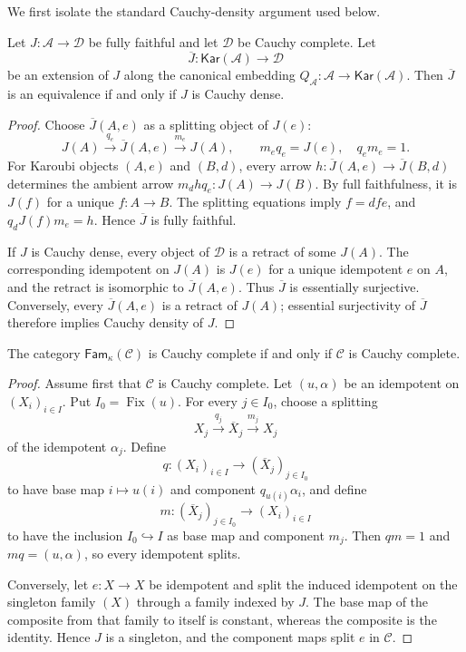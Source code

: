 \documentclass[runningheads,envcountsame]{llncs}
\newcommand{\Fam}{\mathsf{Fam}}
\newcommand{\Kar}{\mathsf{Kar}}
\newcommand{\Fix}{\operatorname{Fix}}
\begin{document}
We first isolate the standard Cauchy-density argument used below.

\begin{lemma}
\label{lem:cauchy-dense-extension-app}
Let $J:\mathcal A\to\mathcal D$ be fully faithful and let $\mathcal D$ be
Cauchy complete.  Let
$$
\overline J:\Kar(\mathcal A)\longrightarrow\mathcal D
$$
be an extension of $J$ along the canonical embedding
$Q_{\mathcal A}:\mathcal A\to\Kar(\mathcal A)$.  Then $\overline J$ is an
equivalence if and only if $J$ is Cauchy dense.
\end{lemma}

\begin{proof}
Choose $\overline J(A,e)$ as a splitting object of $J(e)$:
$$
J(A)\xrightarrow{q_e}\overline J(A,e)
\xrightarrow{m_e}J(A),
\qquad
m_eq_e=J(e),
\quad
q_em_e=1.
$$
For Karoubi objects $(A,e)$ and $(B,d)$, every arrow
$h:\overline J(A,e)\to\overline J(B,d)$ determines the ambient arrow
$m_dhq_e:J(A)\to J(B)$.  By full faithfulness, it is $J(f)$ for a unique
$f:A\to B$.  The splitting equations imply $f=dfe$, and
$q_dJ(f)m_e=h$.  Hence $\overline J$ is fully faithful.

If $J$ is Cauchy dense, every object of $\mathcal D$ is a retract of some
$J(A)$.  The corresponding idempotent on $J(A)$ is $J(e)$ for a unique
idempotent $e$ on $A$, and the retract is isomorphic to
$\overline J(A,e)$.  Thus $\overline J$ is essentially surjective.
Conversely, every $\overline J(A,e)$ is a retract of $J(A)$; essential
surjectivity of $\overline J$ therefore implies Cauchy density of $J$.
\end{proof}

\begin{lemma}
\label{lem:fam-cauchy-app}
The category $\Fam_\kappa(\mathcal C)$ is Cauchy complete if and only if
$\mathcal C$ is Cauchy complete.
\end{lemma}

\begin{proof}
Assume first that $\mathcal C$ is Cauchy complete.  Let $(u,\alpha)$ be an
idempotent on $(X_i)_{i\in I}$.  Put $I_0=\Fix(u)$.  For every $j\in I_0$,
choose a splitting
$$
X_j\xrightarrow{q_j}\overline X_j\xrightarrow{m_j}X_j
$$
of the idempotent $\alpha_j$.  Define
$$
q:(X_i)_{i\in I}\longrightarrow(\overline X_j)_{j\in I_0}
$$
to have base map $i\mapsto u(i)$ and component $q_{u(i)}\alpha_i$, and
define
$$
m:(\overline X_j)_{j\in I_0}\longrightarrow(X_i)_{i\in I}
$$
to have the inclusion $I_0\hookrightarrow I$ as base map and component
$m_j$.  Then $qm=1$ and $mq=(u,\alpha)$, so every idempotent splits.

Conversely, let $e:X\to X$ be idempotent and split the induced idempotent on
the singleton family $(X)$ through a family indexed by $J$.  The base map of
the composite from that family to itself is constant, whereas the composite
is the identity.  Hence $J$ is a singleton, and the component maps split $e$
in $\mathcal C$.
\end{proof}
\end{document}
